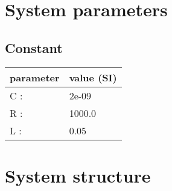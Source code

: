 \documentclass[11pt, oneside]{article}      %
\begin{document}
\section{System parameters}
%
%
\subsection{Constant}
%
\begin{center}
%
\begin{tabular}{ll}
%
\hline
parameter & value (SI)
\\ \hline
C :& 2e-09
\\
R :& 1000.0
\\
L :& 0.05
\\
\hline
\end{tabular}
%
\end{center}
%
\section{System structure}
%
\end{document}
